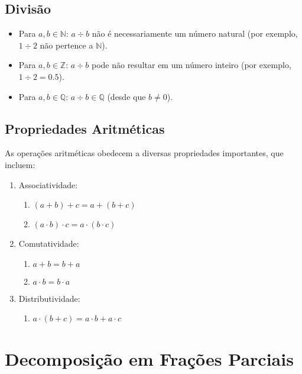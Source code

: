 \documentclass[a4paper,12pt]{article}  %
\begin{document}
\subsection{Divisão}
\begin{itemize}
    \item Para \( a, b \in \mathbb{N} \): \( a \div b \) não é necessariamente um número natural (por exemplo, \( 1 \div 2 \) não pertence a \( \mathbb{N} \)).
    \item Para \( a, b \in \mathbb{Z} \): \( a \div b \) pode não resultar em um número inteiro (por exemplo, \( 1 \div 2 = 0.5 \)).
    \item Para \( a, b \in \mathbb{Q} \): \( a \div b \in \mathbb{Q} \) (desde que \( b \neq 0 \)).
\end{itemize}

\subsection{Propriedades Aritméticas}

As operações aritméticas obedecem a diversas propriedades importantes, que incluem:

\begin{enumerate}[label=\arabic*.] %
    \item Associatividade:
          \begin{enumerate}[label=\alph*)] %
              \item \( (a + b) + c = a + (b + c) \)
              \item \( (a \cdot b) \cdot c = a \cdot (b \cdot c) \)
          \end{enumerate}
    \item Comutatividade:
          \begin{enumerate}[label=\alph*)]
              \item \( a + b = b + a \)
              \item \( a \cdot b = b \cdot a \)
          \end{enumerate}
    \item Distributividade:
          \begin{enumerate}[label=\alph*)]
              \item \( a \cdot (b + c) = a \cdot b + a \cdot c \)
          \end{enumerate}
\end{enumerate}

\section{Decomposição em Frações Parciais}
\end{document}
